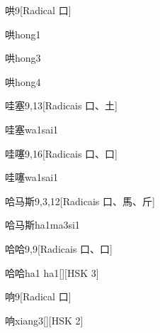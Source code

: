 \begin{entry}{哄}{9}[Radical ⼝]
  \begin{phonetics}{哄}{hong1}
  \end{phonetics}
  \begin{phonetics}{哄}{hong3}
  \end{phonetics}
  \begin{phonetics}{哄}{hong4}
  \end{phonetics}
\end{entry}

\begin{entry}{哇塞}{9,13}[Radicais ⼝、⼟]
  \begin{phonetics}{哇塞}{wa1sai1}
  \end{phonetics}
\end{entry}

\begin{entry}{哇噻}{9,16}[Radicais ⼝、⼝]
  \begin{phonetics}{哇噻}{wa1sai1}
  \end{phonetics}
\end{entry}

\begin{entry}{哈马斯}{9,3,12}[Radicais ⼝、⾺、⽄]
  \begin{phonetics}{哈马斯}{ha1ma3si1}
  \end{phonetics}
\end{entry}

\begin{entry}{哈哈}{9,9}[Radicais ⼝、⼝]
  \begin{phonetics}{哈哈}{ha1 ha1}[][HSK 3]
  \end{phonetics}
\end{entry}

\begin{entry}{响}{9}[Radical ⼝]
  \begin{phonetics}{响}{xiang3}[][HSK 2]
  \end{phonetics}
\end{entry}

